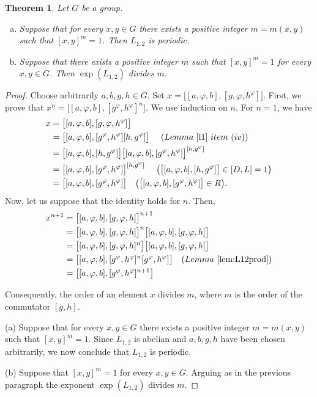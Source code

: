 \documentclass[12pt,leqno]{amsart}
\newtheorem{thm}[theorem]{\sc Theorem}
\begin{document}
\begin{thm}\label{thm:expL12}
Let $G$ be a group. 
\begin{enumerate} [(a)] 
    \item Suppose that for every $x,y \in G$ there exists a positive integer $m=m(x,y)$ such that $[x,y]^m = 1$. Then $L_{1,2}$ is periodic.
    \item Suppose that there exists a positive integer $m$ such that $[x,y]^m=1$ for every $x,y \in G$. Then $\exp(L_{1,2})$ divides $m$. 
\end{enumerate}    
\end{thm}
\begin{proof}
Choose arbitrarily $a,b,g,h\in G$. Set $x= \big[[a,\varphi,b],[g,\varphi,h^{\varphi}]\big]$. 
First, we prove that $x^n = \big[[a,\varphi,b],[g^{\varphi},h^{\varphi}]^n\big]$. We use induction on $n$. For $n=1$, we have
    \begin{align*}
        x&= \big[[a,\varphi,b],[g,\varphi,h^{\varphi}]\big]\\
        &= \big[[a,\varphi,b],[g^{\varphi},h^{\varphi}][h,g^{\varphi}]\big] \ \ \ \ ( Lemma \ \ref{l1}\ item \ (iv))\\
        &= \big[[a,\varphi,b],[h,g^{\varphi}]\big] \big[[a,\varphi,b],[g^{\varphi},h^{\varphi}]\big]^{[h,g^{\varphi}]}\\
        &= \big[[a,\varphi,b],[g^{\varphi},h^{\varphi}]\big]^{[h,g^{\varphi}]} \ \ \ \ \big(\big[[a,\varphi,b],[h,g^{\varphi}]\big]\in [D,L]=1 \big) \\
        &= \big[[a,\varphi,b],[g^{\varphi},h^{\varphi}]\big] \ \ \ \big( \big[[a,\varphi,b],[g^{\varphi},h^{\varphi}]\big]\in R\big).
    \end{align*}
 Now, let us suppose that the identity holds for $n$. 
    Then,
      \begin{align*}
        x^{n+1}&= \big[[a,\varphi,b],[g,{\varphi},h]\big]^{n+1}\\
         &=\big[[a,\varphi,b],[g,{\varphi},h]\big]^{n}\big[[a,\varphi,b],[g,{\varphi},h]\big]\\
        &=\big[[a,\varphi,b],[g,{\varphi},h]^{n}\big]\big[[a,\varphi,b],[g,{\varphi},h]\big] \\
        &=\big[[a,\varphi,b],[g^{\varphi},h^{\varphi}]^n[g^{\varphi},h^{\varphi}]\big] 
      \ \ \ (Lemma \ \ref{lem:L12prod})\\
        &=\big[[a,\varphi,b],[g^{\varphi},h^{\varphi}]^{n+1}\big]
    \end{align*}

Consequently, the order of an element $x$ divides $m$, where $m$ is the order of the commutator $[g,h]$. 

(a) Suppose that for every $x,y \in G$ there exists a positive integer $m=m(x,y)$ such that $[x,y]^m = 1$. Since $L_{1,2}$ is abelian and $a,b,g,h$ have been chosen arbitrarily, we now conclude that $L_{1,2}$ is periodic.

(b) Suppose that $[x,y]^m=1$ for every $x,y \in G$. Arguing as in the previous paragraph the exponent $\exp(L_{1,2})$ divides $m$. 
\end{proof}
\end{document}

